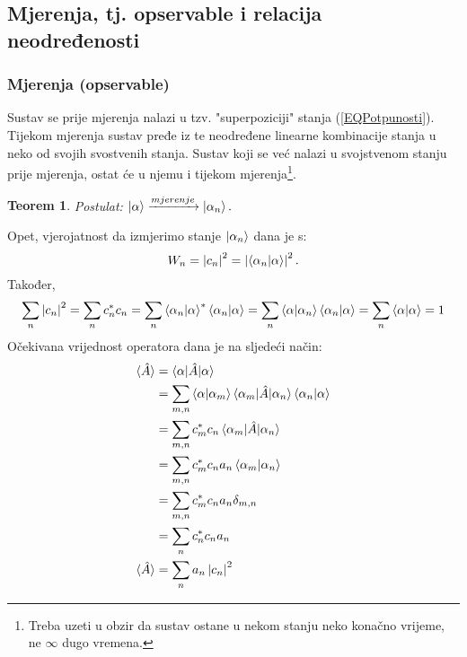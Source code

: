 \documentclass{article}
\newtheorem{theorem}{Teorem}[section]
\numberwithin{equation}{section}
\begin{document}
\subsection{Mjerenja, tj. opservable i relacija neodređenosti}
\subsubsection{Mjerenja (opservable)}
Sustav se prije mjerenja nalazi u tzv. "superpoziciji" stanja (\ref{EQPotpunosti}). Tijekom mjerenja
sustav pređe iz te neodređene linearne kombinacije stanja u neko od svojih svostvenih stanja.
Sustav koji se već nalazi u svojstvenom stanju prije mjerenja, ostat će u njemu i tijekom mjerenja\footnote{Treba uzeti u obzir da sustav ostane
	u nekom stanju neko konačno vrijeme, ne $\infty$ dugo vremena.}.
\begin{theorem}
	Postulat: $\ket{\alpha} \xrightarrow{mjerenje} \ket{\alpha_n}.$
\end{theorem}
Opet, vjerojatnost da izmjerimo stanje $\ket{\alpha_n}$ dana je s:
\begin{equation}
	W_n = \left|c_n\right|^2 = \left|\braket{\alpha_n|\alpha}\right|^2.
\end{equation}
Također,
\begin{equation}
	\sum_n \left|c_n\right|^2 = \sum_n c_n^*c_n = \sum_n \braket{\alpha_n|\alpha}^*\braket{\alpha_n|\alpha} = \sum_n \braket{\alpha|\alpha_n}\braket{\alpha_n|\alpha}
	=\sum_n \braket{\alpha|\alpha}= 1
\end{equation}
Očekivana vrijednost operatora dana je na sljedeći način:
\begin{equation}
	\begin{aligned}
		\braket{\hat{A}} & = \braket{\alpha|\hat{A}|\alpha}                                                                \\
		                 & = \sum_{m,n} \braket{\alpha|\alpha_m}\braket{\alpha_m|\hat{A}|\alpha_n}\braket{\alpha_n|\alpha} \\
		                 & = \sum_{m,n} c_m^*c_n \braket{\alpha_m|\hat{A}|\alpha_n}                                        \\
		                 & = \sum_{m,n} c_m^*c_n a_n \braket{\alpha_m|\alpha_n}                                            \\
		                 & = \sum_{m,n} c_m^*c_n a_n \delta_{m,n}                                                          \\
		                 & = \sum_{n} c_n^*c_n a_n                                                                         \\
		\braket{\hat{A}} & = \sum_n a_n \left|c_n\right|^2
	\end{aligned}
\end{equation}
\end{document}
